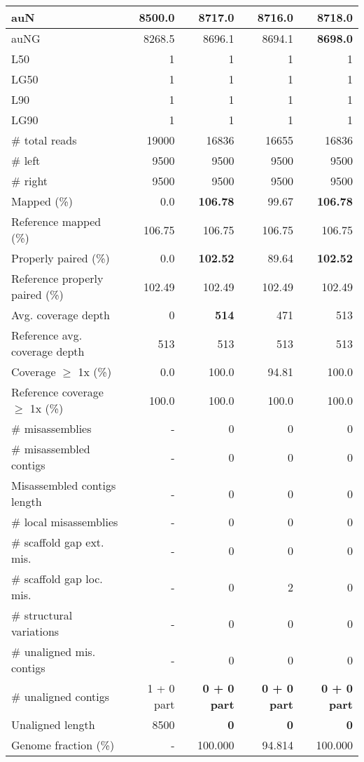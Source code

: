 \documentclass[12pt,a4paper]{article}
\begin{document}
\begin{table}[ht]
\begin{center}
\begin{tabular}{|l*{4}{|r}|}
auN & 8500.0 & 8717.0 & 8716.0 & {\bf 8718.0} \\ \hline
auNG & 8268.5 & 8696.1 & 8694.1 & {\bf 8698.0} \\ \hline
L50 & 1 & 1 & 1 & 1 \\ \hline
LG50 & 1 & 1 & 1 & 1 \\ \hline
L90 & 1 & 1 & 1 & 1 \\ \hline
LG90 & 1 & 1 & 1 & 1 \\ \hline
\# total reads & 19000 & 16836 & 16655 & 16836 \\ \hline
\# left & 9500 & 9500 & 9500 & 9500 \\ \hline
\# right & 9500 & 9500 & 9500 & 9500 \\ \hline
Mapped (\%) & 0.0 & {\bf 106.78} & 99.67 & {\bf 106.78} \\ \hline
Reference mapped (\%) & 106.75 & 106.75 & 106.75 & 106.75 \\ \hline
Properly paired (\%) & 0.0 & {\bf 102.52} & 89.64 & {\bf 102.52} \\ \hline
Reference properly paired (\%) & 102.49 & 102.49 & 102.49 & 102.49 \\ \hline
Avg. coverage depth & 0 & {\bf 514} & 471 & 513 \\ \hline
Reference avg. coverage depth & 513 & 513 & 513 & 513 \\ \hline
Coverage $\geq$ 1x (\%) & 0.0 & 100.0 & 94.81 & 100.0 \\ \hline
Reference coverage $\geq$ 1x (\%) & 100.0 & 100.0 & 100.0 & 100.0 \\ \hline
\# misassemblies & - & 0 & 0 & 0 \\ \hline
\# misassembled contigs & - & 0 & 0 & 0 \\ \hline
Misassembled contigs length & - & 0 & 0 & 0 \\ \hline
\# local misassemblies & - & 0 & 0 & 0 \\ \hline
\# scaffold gap ext. mis. & - & 0 & 0 & 0 \\ \hline
\# scaffold gap loc. mis. & - & 0 & 2 & 0 \\ \hline
\# structural variations & - & 0 & 0 & 0 \\ \hline
\# unaligned mis. contigs & - & 0 & 0 & 0 \\ \hline
\# unaligned contigs & 1 + 0 part & {\bf 0 + 0 part} & {\bf 0 + 0 part} & {\bf 0 + 0 part} \\ \hline
Unaligned length & 8500 & {\bf 0} & {\bf 0} & {\bf 0} \\ \hline
Genome fraction (\%) & - & 100.000 & 94.814 & 100.000 \\ \hline

\end{tabular}
\end{center}
\end{table}
\end{document}
